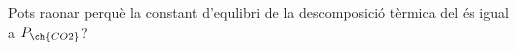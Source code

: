 \begin{exr}{}
Pots raonar perquè la constant d'equlibri de la descomposició tèrmica del  és igual a $P_{\ch{CO2}}$?
\end{exr}
